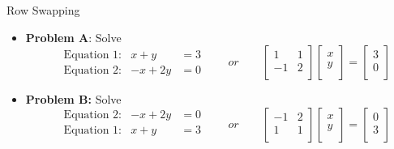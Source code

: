 \documentclass[10pt]{beamer}
\begin{document}
\begin{frame}{Row Swapping}

\begin{itemize}
    \item \textbf{Problem A}: Solve
    $$
    \begin{aligned}
        &\text{Equation 1:} & x + y  &= 3 \\
        &\text{Equation 2:} & -x + 2y  &= 0 
    \end{aligned}
    \quad\quad or \quad\quad 
            \begin{bmatrix}
            1 &  1 \\
            -1 & 2 \\
        \end{bmatrix}
        \begin{bmatrix}
            x \\
            y \\
        \end{bmatrix}
        =
        \begin{bmatrix}
            3 \\
            0 \\
        \end{bmatrix}
    $$
    
\item<2> \textbf{Problem B:} Solve 
    $$
    \begin{aligned}
        &\text{Equation 2:} & -x + 2y  &= 0 \\
        &\text{Equation 1:} & x + y  &= 3 \\
    \end{aligned}
        \quad\quad or \quad\quad  
            \begin{bmatrix}
            -1 & 2 \\
            1 &  1 \\
        \end{bmatrix}
        \begin{bmatrix}
            x \\
            y \\
        \end{bmatrix}
        =
        \begin{bmatrix}
            0 \\
            3 \\
        \end{bmatrix}
    $$
\end{itemize}

\end{frame}
\end{document}
